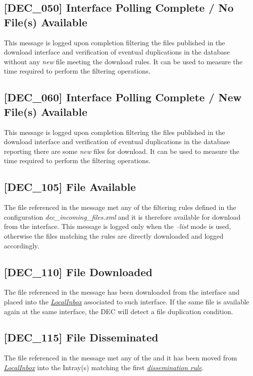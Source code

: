 \documentclass[dec_sum_main.tex]{subfiles}
\begin{document}
\label{DEC050}
\subsection{[DEC\_050] Interface Polling Complete / No File(s) Available}
This message is logged upon completion filtering the files published in the download interface and verification of eventual duplications in the database without any \textit{new} file meeting the download rules. It can be used to measure the time required to perform the filtering operations.

\label{DEC060}
\subsection{[DEC\_060] Interface Polling Complete / New File(s) Available}
This message is logged upon completion filtering the files published in the download interface and verification of eventual duplications in the database reporting there are some \textit{new} files for download. It can be used to measure the time required to perform the filtering operations.

\subsection{[DEC\_105] File Available}
The file referenced in the message met any of the filtering rules defined in the configuration \textit{dec\_incoming\_files.xml} and it is therefore available for download from the interface. This message is logged only when the \textit{--list} mode is used, otherwise the files matching the rules are directly downloaded and logged accordingly. 

\subsection{[DEC\_110] File Downloaded}
The file referenced in the message has been downloaded from the interface and placed into the \hyperref[LocalInbox]{\textit{LocalInbox}} associated to such interface. If the same file is available again at the same interface, the DEC will detect a file duplication condition.

\subsection{[DEC\_115] File Disseminated}
The file referenced in the message met any of the and it has been moved from \hyperref[LocalInbox]{\textit{LocalInbox}} into the Intray(s) matching the first \hyperref[Dissemination rules]{\textit{dissemination rule}}.
\end{document}
